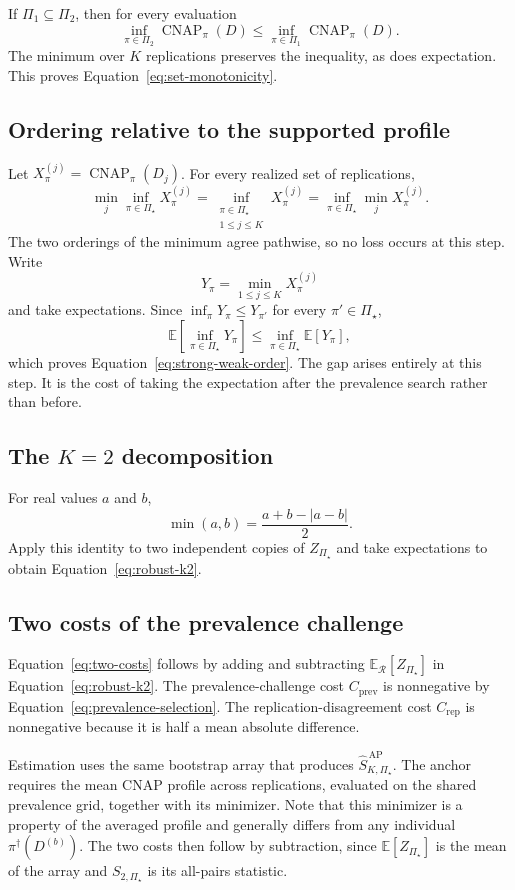 \documentclass[11pt]{article}
\newcommand{\CNAP}{\operatorname{CNAP}}
\newcommand{\Regime}{\mathcal{R}}
\newcommand{\PSet}{\Pi_\star}
\newcommand{\E}{\mathbb{E}}
\newcommand{\SRobHat}{\widehat S_{K,\PSet}^{\,\mathrm{AP}}}
\theoremstyle{remark}
\begin{document}
If $\Pi_1\subseteq\Pi_2$, then for every evaluation
\[
\inf_{\pi\in\Pi_2}\CNAP_\pi(D)
\leq
\inf_{\pi\in\Pi_1}\CNAP_\pi(D).
\]
The minimum over $K$ replications preserves the inequality, as does expectation. This proves Equation~\eqref{eq:set-monotonicity}.

\subsection{Ordering relative to the supported profile}

Let $X_\pi^{(j)}=\CNAP_\pi(D_j)$. For every realized set of replications,
\[
\min_j\inf_{\pi\in\PSet}X_\pi^{(j)}
=
\inf_{\substack{\pi\in\PSet\\1\leq j\leq K}}
X_\pi^{(j)}
=
\inf_{\pi\in\PSet}\min_jX_\pi^{(j)}.
\]
The two orderings of the minimum agree pathwise, so no loss occurs at this step. Write
\[
Y_\pi=\min_{1\leq j\leq K}X_\pi^{(j)}
\]
and take expectations. Since $\inf_\pi Y_\pi\leq Y_{\pi'}$ for every $\pi'\in\PSet$,
\[
\E\left[\inf_{\pi\in\PSet}Y_\pi\right]
\leq
\inf_{\pi\in\PSet}\E[Y_\pi],
\]
which proves Equation~\eqref{eq:strong-weak-order}. The gap arises entirely at this step. It is the cost of taking the expectation after the prevalence search rather than before.

\subsection{The $K=2$ decomposition}

For real values $a$ and $b$,
\[
\min(a,b)
=
\frac{a+b-|a-b|}{2}.
\]
Apply this identity to two independent copies of $Z_{\PSet}$ and take expectations to obtain Equation~\eqref{eq:robust-k2}.

\subsection{Two costs of the prevalence challenge}
\label{app:penalty}

Equation~\eqref{eq:two-costs} follows by adding and subtracting $\E_{\Regime}[Z_{\PSet}]$ in Equation~\eqref{eq:robust-k2}. The prevalence-challenge cost $C_{\mathrm{prev}}$ is nonnegative by Equation~\eqref{eq:prevalence-selection}. The replication-disagreement cost $C_{\mathrm{rep}}$ is nonnegative because it is half a mean absolute difference.

Estimation uses the same bootstrap array that produces $\SRobHat$. The anchor requires the mean CNAP profile across replications, evaluated on the shared prevalence grid, together with its minimizer. Note that this minimizer is a property of the averaged profile and generally differs from any individual $\pi^\dagger(D^{(b)})$. The two costs then follow by subtraction, since $\E[Z_{\PSet}]$ is the mean of the array and $S_{2,\PSet}$ is its all-pairs statistic.
\end{document}
